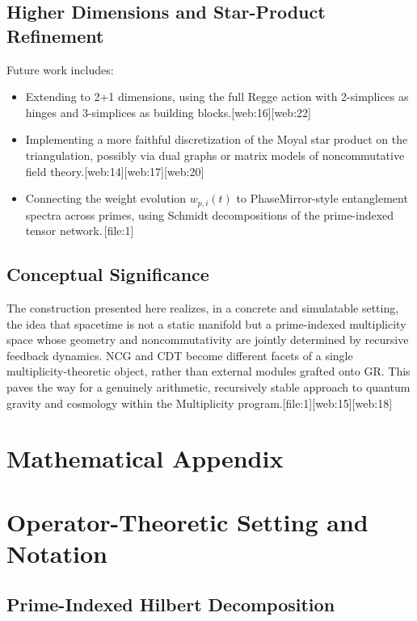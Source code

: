\documentclass[11pt]{article}
\begin{document}
\subsection{Higher Dimensions and Star-Product Refinement}

Future work includes:
\begin{itemize}
  \item Extending to 2+1 dimensions, using the full Regge action with
        2-simplices as hinges and 3-simplices as building blocks.[web:16][web:22]
  \item Implementing a more faithful discretization of the Moyal star
        product on the triangulation, possibly via dual graphs or matrix
        models of noncommutative field theory.[web:14][web:17][web:20]
  \item Connecting the weight evolution \(w_{p,i}(t)\) to PhaseMirror-style
        entanglement spectra across primes, using Schmidt decompositions of
        the prime-indexed tensor network.\,[file:1]
\end{itemize}

\subsection{Conceptual Significance}

The construction presented here realizes, in a concrete and simulatable
setting, the idea that spacetime is not a static manifold but a
prime-indexed multiplicity space whose geometry and noncommutativity are
jointly determined by recursive feedback dynamics. NCG and CDT become
different facets of a single multiplicity-theoretic object, rather than
external modules grafted onto GR. This paves the way for a genuinely
arithmetic, recursively stable approach to quantum gravity and cosmology
within the Multiplicity program.[file:1][web:15][web:18]

\appendix
\section*{Mathematical Appendix}

\section{Operator-Theoretic Setting and Notation}

\subsection{Prime-Indexed Hilbert Decomposition}
\end{document}
